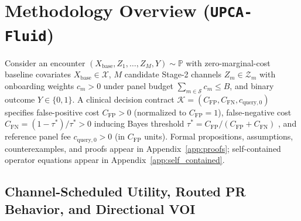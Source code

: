 \documentclass[11pt]{article}
\theoremstyle{remark}
\begin{document}
\section{Methodology Overview (\texorpdfstring{\texttt{UPCA-Fluid}}{UPCA-Fluid})}
\label{sec:methods}

Consider an encounter $(X_{\text{base}}, Z_1, \dots, Z_M, Y) \sim \mathbb{P}$ with zero-marginal-cost baseline covariates $X_{\text{base}} \in \mathcal{X}$, $M$ candidate Stage-2 channels $Z_m \in \mathcal{Z}_m$ with onboarding weights $c_m > 0$ under panel budget $\sum_{m \in \mathcal{S}} c_m \le B$, and binary outcome $Y \in \{0,1\}$. A clinical decision contract $\mathcal{K} = (C_{\text{FP}}, C_{\text{FN}}, c_{\text{query},0})$ specifies false-positive cost $C_{\text{FP}} > 0$ (normalized to $C_{\text{FP}}=1$), false-negative cost $C_{\text{FN}} = (1-\tau^*)/\tau^* > 0$ inducing Bayes threshold $\tau^* = C_{\text{FP}} / (C_{\text{FP}} + C_{\text{FN}})$ \citep{vickers2006decision}, and reference panel fee $c_{\text{query},0} > 0$ (in $C_{\text{FP}}$ units). Formal propositions, assumptions, counterexamples, and proofs appear in Appendix~\ref{app:proofs}; self-contained operator equations appear in Appendix~\ref{app:self_contained}.

\subsection{Channel-Scheduled Utility, Routed PR Behavior, and Directional VOI}
\label{sec:metrics}
\end{document}
